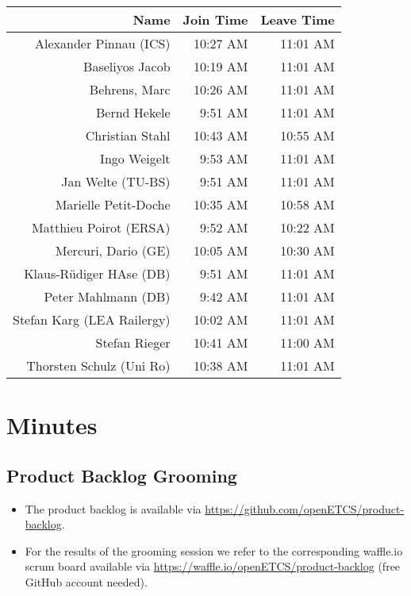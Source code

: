 \documentclass[a4paper, 11pt]{article}
\begin{document}
\begin{table}[htbp]
    \begin{tabular}{rrr}
    \toprule
    \textbf{Name} & \textbf{Join Time} & \textbf{Leave Time} \\
    \midrule
    Alexander Pinnau (ICS) & 10:27 AM & 11:01 AM \\
    Baseliyos Jacob & 10:19 AM & 11:01 AM \\
    Behrens, Marc & 10:26 AM & 11:01 AM \\
    Bernd Hekele & 9:51 AM & 11:01 AM \\
    Christian Stahl & 10:43 AM & 10:55 AM \\
    Ingo Weigelt & 9:53 AM & 11:01 AM \\
    Jan Welte (TU-BS) & 9:51 AM & 11:01 AM \\
    Marielle Petit-Doche & 10:35 AM & 10:58 AM \\
    Matthieu Poirot (ERSA) & 9:52 AM & 10:22 AM \\
    Mercuri, Dario (GE) & 10:05 AM & 10:30 AM \\
    Klaus-R\"udiger HAse (DB) & 9:51 AM & 11:01 AM \\
    Peter Mahlmann (DB) & 9:42 AM & 11:01 AM \\
    Stefan Karg (LEA Railergy) & 10:02 AM & 11:01 AM \\
    Stefan Rieger & 10:41 AM & 11:00 AM \\
    Thorsten Schulz (Uni Ro) & 10:38 AM & 11:01 AM \\
    \bottomrule
    \end{tabular}%
  \label{tab:addlabel}%
\end{table}%




\section{Minutes}

\subsection{Product Backlog Grooming}
\begin{itemize}
\item The product backlog is available via 
\url{https://github.com/openETCS/product-backlog}. 
\item For the results of the grooming session we refer to the corresponding waffle.io scrum board available via \url{https://waffle.io/openETCS/product-backlog} (free GitHub account needed).
\end{itemize}
\end{document}
